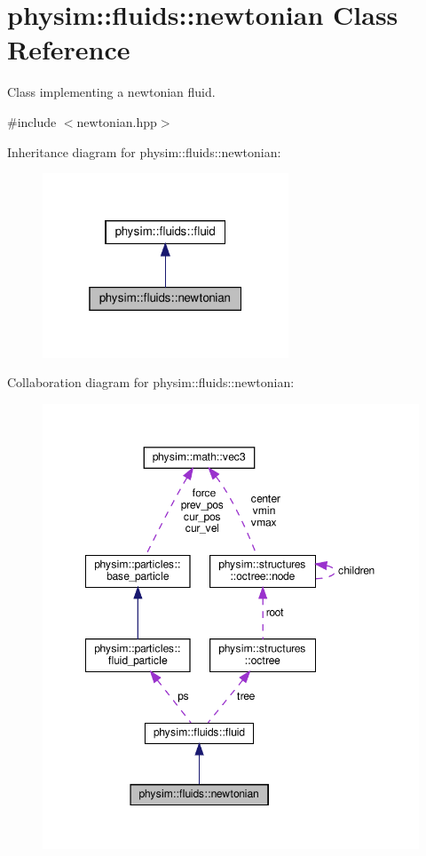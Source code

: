 \hypertarget{classphysim_1_1fluids_1_1newtonian}{}\section{physim\+:\+:fluids\+:\+:newtonian Class Reference}
\label{classphysim_1_1fluids_1_1newtonian}


Class implementing a newtonian fluid.  




{\ttfamily \#include $<$newtonian.\+hpp$>$}



Inheritance diagram for physim\+:\+:fluids\+:\+:newtonian\+:\nopagebreak
\begin{figure}[H]
\begin{center}
\leavevmode
\includegraphics[width=208pt]{classphysim_1_1fluids_1_1newtonian__inherit__graph}
\end{center}
\end{figure}


Collaboration diagram for physim\+:\+:fluids\+:\+:newtonian\+:\nopagebreak
\begin{figure}[H]
\begin{center}
\leavevmode
\includegraphics[width=349pt]{classphysim_1_1fluids_1_1newtonian__coll__graph}
\end{center}
\end{figure}
